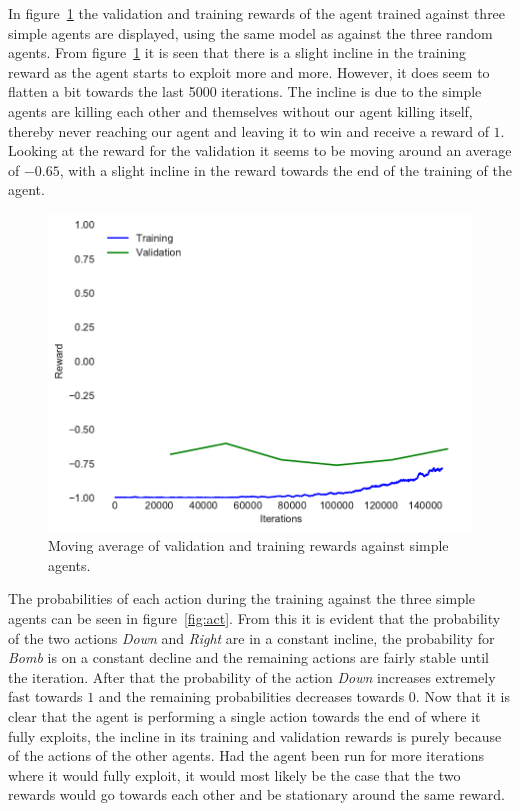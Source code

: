 In figure~\ref{fig:resultssimple} the validation and training rewards of the agent trained against three simple agents are displayed, using the same model as against the three random agents. From figure~\ref{fig:resultssimple} it is seen that there is a slight incline in the training reward as the agent starts to exploit more and more. However, it does seem to flatten a bit towards the last 5000 iterations. The incline is due to the simple agents are killing each other and themselves without our agent killing itself, thereby never reaching our agent and leaving it to win and receive a reward of $1$. Looking at the reward for the validation it seems to be moving around an average of $-0.65$, with a slight incline in the reward towards the end of the training of the agent.

\begin{figure}[htb]
    \centerline{\includegraphics[width=1.0\linewidth]{pommerman/plots/train_val.pdf}}
    \caption{Moving average of validation and training rewards against simple agents.}\label{fig:resultssimple}
\end{figure}

The probabilities of each action during the training against the three simple agents can be seen in figure~\ref{fig:act}. From this it is evident that the probability of the two actions \emph{Down} and \emph{Right} are in a constant incline, the probability for \emph{Bomb} is on a constant decline and the remaining actions are fairly stable until the  iteration. After that the probability of the action \emph{Down} increases extremely fast towards $1$ and the remaining probabilities decreases towards $0$. Now that it is clear that the agent is performing a single action towards the end of where it fully exploits, the incline in its training and validation rewards is purely because of the actions of the other agents. Had the agent been run for more iterations where it would fully exploit, it would most likely be the case that the two rewards would go towards each other and be stationary around the same reward.

